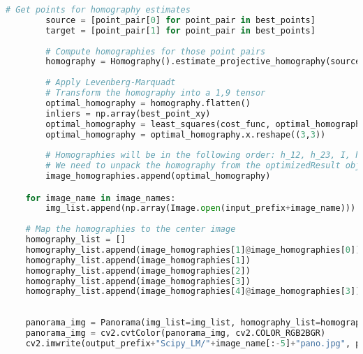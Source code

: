 \documentclass{article}
\begin{document}
\begin{lstlisting}[language=Python]
        # Get points for homography estimates
        source = [point_pair[0] for point_pair in best_points]
        target = [point_pair[1] for point_pair in best_points]
        
        # Compute homographies for those point pairs
        homography = Homography().estimate_projective_homography(source, target)
        
        # Apply Levenberg-Marquadt
        # Transform the homography into a 1,9 tensor
        optimal_homography = homography.flatten()
        inliers = np.array(best_point_xy)
        optimal_homography = least_squares(cost_func, optimal_homography, args=(inliers,), method='lm')
        optimal_homography = optimal_homography.x.reshape((3,3))
        
        # Homographies will be in the following order: h_12, h_23, I, h_43, h_54
        # We need to unpack the homography from the optimizedResult object by getting the x value
        image_homographies.append(optimal_homography)

    for image_name in image_names:
        img_list.append(np.array(Image.open(input_prefix+image_name)))
    
    # Map the homographies to the center image
    homography_list = []
    homography_list.append(image_homographies[1]@image_homographies[0])
    homography_list.append(image_homographies[1])
    homography_list.append(image_homographies[2])
    homography_list.append(image_homographies[3])
    homography_list.append(image_homographies[4]@image_homographies[3])
    
    
    panorama_img = Panorama(img_list=img_list, homography_list=homography_list).get_image_results()
    panorama_img = cv2.cvtColor(panorama_img, cv2.COLOR_RGB2BGR)
    cv2.imwrite(output_prefix+"Scipy_LM/"+image_name[:-5]+"pano.jpg", panorama_img)

\end{lstlisting}
\end{document}
